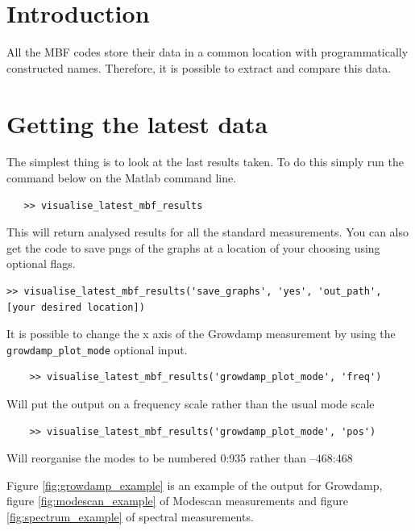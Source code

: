 \documentclass{report}
\begin{document}
\section{Introduction}

All the MBF codes store their data in a common location with programmatically constructed names. Therefore, it is possible to extract and compare this data. 

\section{Getting the latest data} 

The simplest thing is to look at the last results taken. To do this simply run the command below on the Matlab command line. 
\begin{verbatim}
   >> visualise_latest_mbf_results 
\end{verbatim}
 This will return analysed results for all the standard measurements.
 You can also get the code to save pngs of the graphs at a location of your choosing using optional flags.
\begin{verbatim}
>> visualise_latest_mbf_results('save_graphs', 'yes', 'out_path', [your desired location])
\end{verbatim}
It is possible to change the x axis of the Growdamp measurement by using the  \verb+growdamp_plot_mode+ optional input.
\begin{verbatim}
    >> visualise_latest_mbf_results('growdamp_plot_mode', 'freq') 
\end{verbatim}
Will put the output on a frequency scale rather than the usual mode scale 
\begin{verbatim}
    >> visualise_latest_mbf_results('growdamp_plot_mode', 'pos') 
\end{verbatim}
Will reorganise the modes to be numbered 0:935 rather than –468:468 

Figure \ref{fig:growdamp_example} is an example of the output for Growdamp, figure \ref{fig:modescan_example} of Modescan measurements and figure \ref{fig:spectrum_example} of spectral measurements.
\end{document}
